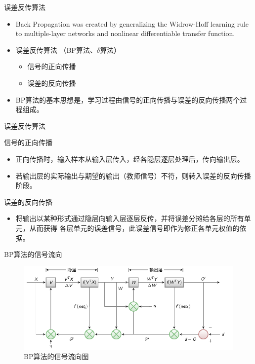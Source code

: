 \documentclass[xcolor=svgnames]{beamer}
\begin{document}
\begin{frame}{误差反传算法}
  \begin{itemize}
  \item
    Back Propagation was created by \alert{generalizing} the \alert{
      Widrow-Hoff} learning rule to \alert{multiple-layer} networks and
    \alert{nonlinear} differentiable transfer function.
  \item
    误差反传算法 （BP算法、$\delta$算法）
    \begin{itemize}
    \item 信号的正向传播
    \item 误差的反向传播
    \end{itemize}
  \item
    BP算法的基本思想是，学习过程由信号的正向传播与误差的反向传播两个过程组成。
  \end{itemize}
\end{frame}


\begin{frame}{误差反传算法}
  \begin{block}{信号的正向传播}
    \begin{itemize}
    \item
      正向传播时，输入样本从输入层传入，经各隐层逐层处理后，传向输出层。
    \item
      若输出层的实际输出与期望的输出（教师信号）不符，则转入误差的反向传播阶段。
    \end{itemize}
  \end{block}
  \begin{block}{误差的反向传播}
    \begin{itemize}
    \item 将输出以某种形式通过隐层向输入层逐层反传，并将误差分摊给各层的所有单元，从而获得%
      各层单元的误差信号，此误差信号即作为修正各单元权值的依据。
    \end{itemize}
  \end{block}
\end{frame}

\begin{frame}{BP算法的信号流向}
  \begin{figure}
    \begin{center}
      \includegraphics[width=\textwidth]{fig06.pdf}
    \end{center}
    \caption{BP算法的信号流向图}
    \label{signal}
  \end{figure}
\end{frame}
\end{document}
